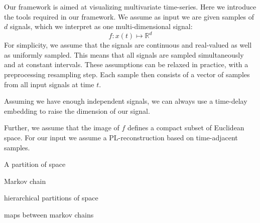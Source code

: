 \label{sec:preliminaries}
Our framework is aimed at visualizing multivariate time-series. Here we introduce the tools required in our framework. We assume as input we are given samples of $d$ signals, which we interpret as one multi-dimensional signal:
$$f: x(t)\mapsto \mathbb{R}^d$$
For simplicity, we assume that the signals are continuous and real-valued as well as uniformly sampled. This means that all signals are sampled simultaneously and at constant intervals. These assumptions can be relaxed in practice, with a preprocessing resampling step.  Each sample then consists of a vector of samples from all input signals at time $t$. 

Assuming we have enough independent signals, we can always use a time-delay embedding to raise the dimension of our signal. 

Further, we assume that the image of $f$ defines a compact subset of Euclidean space. For our input we assume a PL-reconstruction based on time-adjacent samples.

A partition of space 

Markov chain

hierarchical partitions of space

maps between markov chains


